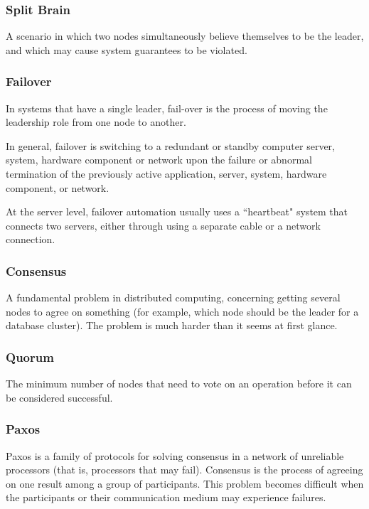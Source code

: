 \documentclass{article}
\begin{document}
    \subsubsection{Split Brain} 
    A scenario in which two nodes simultaneously believe themselves to be the leader, and which may cause system guarantees to be violated.
    
    \subsubsection{Failover}
    In systems that have a single leader, fail-over is the process of moving the leadership role from one node to another.
    
    In general, failover is switching to a redundant or standby computer server, system, hardware component or network upon the failure or abnormal termination of the previously active application, server, system, hardware component, or network.
    
    At the server level, failover automation usually uses a ``heartbeat" system that connects two servers, either through using a separate cable or a network connection.
    
    \subsubsection{Consensus}
    A fundamental problem in distributed computing, concerning getting several nodes to agree on something (for example, which node should be the leader for a database cluster). The problem is much harder than it seems at first glance.
    
    \subsubsection{Quorum}
    The minimum number of nodes that need to vote on an operation before it can be considered successful.
    
    \subsubsection{Paxos}
    Paxos is a family of protocols for solving consensus in a network of unreliable processors (that is, processors that may fail). Consensus is the process of agreeing on one result among a group of participants. This problem becomes difficult when the participants or their communication medium may experience failures.
    
\end{document}
